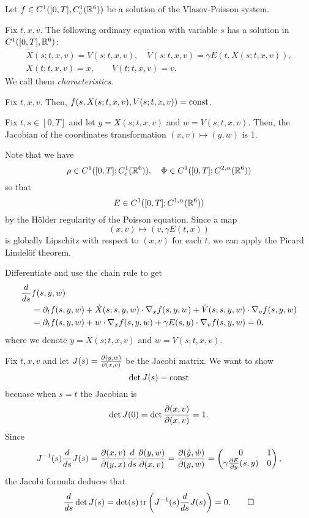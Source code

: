 \documentclass[11pt]{amsart}
\begin{document}
\begin{lem}
Let $f\in C^1([0,T],C_c^1(\mathbb{R}^6))$ be a solution of the Vlasov-Poisson system.
\begin{cond}
\item Fix $t,x,v$. The following ordinary equation with variable $s$ has a solution in $C^1([0,T],\mathbb{R}^6)$:
\begin{gather*}
\dot X(s;t,x,v)=V(s;t,x,v),\quad\dot V(s;t,x,v)=\gamma E(t,X(s;t,x,v)),\\
X(t;t,x,v)=x,\qquad V(t;t,x,v)=v.
\end{gather*}
We call them \emph{characteristics}.
\item Fix $t,x,v$. Then, $f(s,X(s;t,x,v),V(s;t,x,v))=\operatorname{const}$.
\item Fix $t,s\in[0,T]$ and let $y=X(s;t,x,v)$ and $w=V(s;t,x,v)$. Then, the Jacobian of the coordinates transformation $(x,v)\mapsto(y,w)$ is 1.
\end{cond}
\end{lem}
\begin{pfs}
\item
Note that we have
\[\rho\in C^1([0,T];C_c^1(\mathbb{R}^6)),\quad\Phi\in C^1([0,T];C^{2,\alpha}(\mathbb{R}^6))\]
so that
\[E\in C^1([0,T];C^{1,\alpha}(\mathbb{R}^6))\]
by the H\"older regularity of the Poisson equation.
Since a map
\[(x,v)\mapsto(v,\gamma E(t,x))\]
is globally Lipschitz with respect to $(x,v)$ for each $t$, we can apply the Picard Lindel\"of theorem.

\item
Differentiate and use the chain rule to get
\begin{align*}
\dd{s}&f(s,y,w)\\
&=\pd_tf(s,y,w)+\dot X(s;s,y,w)\cdot\del_xf(s,y,w)+\dot V(s;s,y,w)\cdot\del_vf(s,y,w)\\
&=\pd_tf(s,y,w)+w\cdot\del_xf(s,y,w)+\gamma E(s,y)\cdot\del_vf(s,y,w)=0,
\end{align*}
where we denote $y=X(s;t,x,v)$ and $w=V(s;t,x,v)$.

\item
Fix $t,x,v$ and let $J(s)=\pd{(y,w)}{(x,v)}$ be the Jacobi matrix.
We want to show
\[\det J(s)=\operatorname{const}\]
becuase when $s=t$ the Jacobian is
\[\det J(0)=\det\pd{(x,v)}{(x,v)}=1.\]
Since
\[J^{-1}(s)\dd{s}J(s)=\pd{(x,v)}{(y,x)}\dd{s}\pd{(y,w)}{(x,v)}=\pd{(\dot y,\dot w)}{(y,w)}=\mat{0&1\\\gamma\pd{E}{y}(s,y)&0},\]
the Jacobi formula deduces that
\[\dd{s}\det J(s)=\det(s)\tr\left(J^{-1}(s)\dd{s}J(s)\right)=0.\qedhere\]

\end{pfs}
\end{document}
